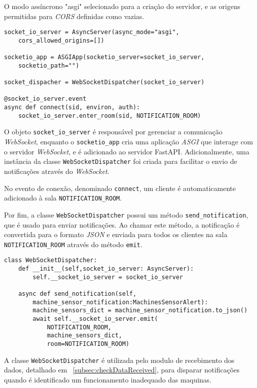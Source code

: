 O modo assíncrono "asgi" selecionado para a criação do servidor, e as origens permitidas para \textit{CORS} definidas como vazias.

\begin{verbatim}
socket_io_server = AsyncServer(async_mode="asgi",
    cors_allowed_origins=[])

socketio_app = ASGIApp(socketio_server=socket_io_server,
    socketio_path="")

socket_dispacher = WebSocketDispatcher(socket_io_server)

@socket_io_server.event
async def connect(sid, environ, auth):
    socket_io_server.enter_room(sid, NOTIFICATION_ROOM)
\end{verbatim}

O objeto \texttt{socket\_io\_server} é responsável por gerenciar a comunicação \textit{WebSocket}, enquanto o \texttt{socketio\_app} cria uma aplicação \textit{ASGI} que interage com o servidor \textit{WebSocket}, e é adicionado ao servidor FastAPI. Adicionalmente, uma instância da classe \texttt{WebSocketDispatcher} foi criada para facilitar o envio de notificações através do \textit{WebSocket}.

No evento de conexão, denominado \texttt{connect}, um cliente é automaticamente adicionado à sala \texttt{NOTIFICATION\_ROOM}.

Por fim, a classe \texttt{WebSocketDispatcher} possui um método \texttt{send\_notification}, que é usado para enviar notificações. Ao chamar este método, a notificação é convertida para o formato \textit{JSON} e enviada para todos os clientes na sala \texttt{NOTIFICATION\_ROOM} através do método \texttt{emit}.

\begin{verbatim}
class WebSocketDispatcher:
    def __init__(self,socket_io_server: AsyncServer):
        self.__socket_io_server = socket_io_server
    
    async def send_notification(self,
        machine_sensor_notification:MachinesSensorAlert):
        machine_sensors_dict = machine_sensor_notification.to_json()
        await self.__socket_io_server.emit(
            NOTIFICATION_ROOM,
            machine_sensors_dict,
            room=NOTIFICATION_ROOM)
\end{verbatim}

A classe \texttt{WebSocketDispatcher} é utilizada pelo modulo de recebimento dos dados, detalhado em ~\ref{subsec:checkDataReceived}, para disparar notificações quando é identificado um funcionamento inadequado das maquinas.


